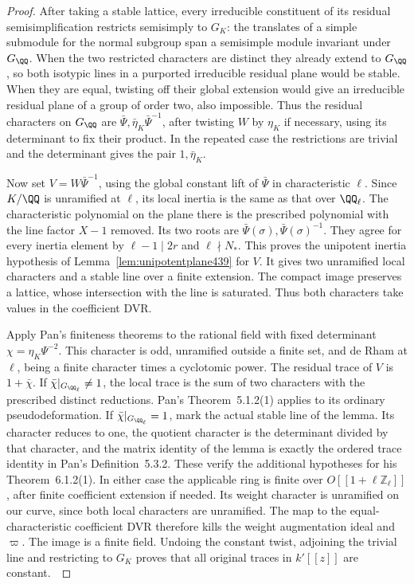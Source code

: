 \documentclass[a4paper,11pt]{article}
\theoremstyle{definition}
\theoremstyle{remark}
\newcommand{\ZZ}{\mathbb Z}\newcommand{\ord}{\operatorname{ord}}
\numberwithin{equation}{section}
\begin{document}
\begin{proof}
After taking a stable lattice, every irreducible constituent
of its residual semisimplification restricts semisimply to
\(G_K\): the translates of a simple submodule for the normal
subgroup span a semisimple module invariant under \(G_\QQ\).
When the two restricted characters are distinct they already
extend to \(G_\QQ\), so both isotypic lines in a purported
irreducible residual plane would be stable. When they are
equal, twisting off their global extension would give an
irreducible residual plane of a group of order two, also
impossible. Thus the residual characters on \(G_\QQ\) are
\(\bar\Psi,\bar\eta_K\bar\Psi^{-1}\), after twisting \(W\)
by \(\eta_K\) if necessary, using its determinant to fix
their product. In the repeated case the restrictions are
trivial and the determinant gives the pair \(1,\bar\eta_K\).

Now set \(V=W\bar\Psi^{-1}\), using the global constant
lift of \(\bar\Psi\) in characteristic \(\ell\).
Since \(K/\QQ\) is unramified at \(\ell\), its local inertia
is the same as that over \(\QQ_\ell\). The characteristic
polynomial on the plane there is the prescribed polynomial
with the line factor \(X-1\) removed. Its two roots are
\(\bar\Psi(\sigma),\bar\Psi(\sigma)^{-1}\).
They agree for every inertia element by \(\ell-1\mid2r\)
and \(\ell\nmid N_*\). This proves the unipotent inertia
hypothesis of Lemma~\ref{lem:unipotentplane439} for \(V\).
It gives two unramified local characters and a stable line
over a finite extension. The compact image preserves a
lattice, whose intersection with the line is saturated.
Thus both characters take values in the coefficient DVR.

Apply Pan's finiteness theorems to the rational field with
fixed determinant \(\chi=\eta_K\Psi^{-2}\). This character
is odd, unramified outside a finite set, and de Rham at
\(\ell\), being a finite character times a cyclotomic
power. The residual trace of \(V\) is \(1+\bar\chi\).
If \(\bar\chi|_{G_{\QQ_\ell}}\ne1\), the local trace is
the sum of two characters with the prescribed distinct
reductions. Pan's Theorem~5.1.2(1) applies to its ordinary
pseudodeformation. If \(\bar\chi|_{G_{\QQ_\ell}}=1\), mark
the actual stable line of the lemma. Its character reduces
to one, the quotient character is the determinant divided
by that character, and the matrix identity of the lemma
is exactly the ordered trace identity in Pan's Definition~5.3.2.
These verify the additional hypotheses for his
Theorem~6.1.2(1). In either case the applicable ring is
finite over \(O[[1+\ell\ZZ_\ell]]\), after finite coefficient
extension if needed. Its weight character is unramified on
our curve, since both local characters are unramified.
The map to the equal-characteristic coefficient DVR therefore
kills the weight augmentation ideal and \(\varpi\). The
image is a finite field. Undoing the constant twist, adjoining
the trivial line and restricting to \(G_K\) proves that all
original traces in \(k'[[z]]\) are constant.~\cite{XI-VIII-VI-pan40}


\end{proof}
\end{document}
